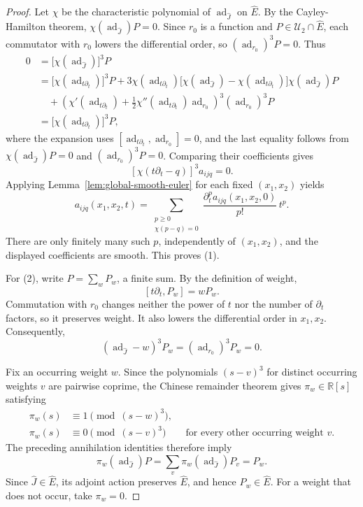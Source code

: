 \documentclass{tCON2e}
\newenvironment{revision}{\begingroup\color{black}}{\endgroup}
\numberwithin{equation}{section}
\theoremstyle{journalplain}
\theoremstyle{journaldef}
\newenvironment{revision}{}{}
\begin{document}
\begin{revision}
\begin{proof}
Let $\chi$ be the characteristic polynomial of
$\operatorname{ad}_{\widehat J}$ on $\widehat E$.
By the Cayley-Hamilton theorem,
$\chi(\operatorname{ad}_{\widehat J})P=0$.
Since $r_0$ is a function and $P\in\mathcal U_2\cap\widehat E$,
each commutator with $r_0$ lowers the differential order,
so $(\operatorname{ad}_{r_0})^3P=0$.
Thus
\[
\begin{aligned}
0
&=\bigl[\chi(\operatorname{ad}_{\widehat J})\bigr]^3P\\
&=\bigl[\chi(\operatorname{ad}_{t\partial_t})\bigr]^3P
+3\chi(\operatorname{ad}_{t\partial_t})
\bigl[\chi(\operatorname{ad}_{\widehat J})
-\chi(\operatorname{ad}_{t\partial_t})\bigr]
\chi(\operatorname{ad}_{\widehat J})P\\
&\quad+
\left(
\chi'(\operatorname{ad}_{t\partial_t})
+\frac12\chi''(\operatorname{ad}_{t\partial_t})
\operatorname{ad}_{r_0}
\right)^3
(\operatorname{ad}_{r_0})^3P\\
&=\bigl[\chi(\operatorname{ad}_{t\partial_t})\bigr]^3P,
\end{aligned}
\]
where the expansion uses
$[\operatorname{ad}_{t\partial_t},\operatorname{ad}_{r_0}]=0$,
and the last equality follows from
$\chi(\operatorname{ad}_{\widehat J})P=0$
and $(\operatorname{ad}_{r_0})^3P=0$. Comparing their coefficients gives
\[
[\chi(t\partial_t-q)]^3a_{ijq}=0.
\]
Applying Lemma~\ref{lem:global-smooth-euler} for each fixed
$(x_1,x_2)$ yields
\[
a_{ijq}(x_1,x_2,t)
=
\sum_{\substack{p\ge0\\\chi(p-q)=0}}
\frac{\partial_t^p a_{ijq}(x_1,x_2,0)}{p!}\,t^p.
\]
There are only finitely many such $p$, independently of
$(x_1,x_2)$, and the displayed coefficients are smooth.
This proves (1).

For (2), write $P=\sum_w P_w$, a finite sum.
By the definition of weight,
\[
[t\partial_t,P_w]=wP_w.
\]
Commutation with $r_0$ changes neither the power of $t$
nor the number of $\partial_t$ factors, so it preserves
weight. It also lowers the differential order in
$x_1,x_2$. Consequently,
\[
(\operatorname{ad}_{\widehat J}-w)^3P_w
=(\operatorname{ad}_{r_0})^3P_w=0.
\]

Fix an occurring weight $w$. Since the polynomials
$(s-v)^3$ for distinct occurring weights $v$ are pairwise
coprime, the Chinese remainder theorem gives
$\pi_w\in\mathbb R[s]$ satisfying
\[
\begin{aligned}
\pi_w(s)&\equiv1\pmod{(s-w)^3},\\
\pi_w(s)&\equiv0\pmod{(s-v)^3}
\qquad\text{for every other occurring weight }v.
\end{aligned}
\]
The preceding annihilation identities therefore imply
\[
\pi_w(\operatorname{ad}_{\widehat J})P
=
\sum_v\pi_w(\operatorname{ad}_{\widehat J})P_v
=P_w.
\]
Since $\widehat J\in\widehat E$, its adjoint action
preserves $\widehat E$, and hence $P_w\in\widehat E$.
For a weight that does not occur, take $\pi_w=0$.
\end{proof}


\end{revision}
\end{document}
